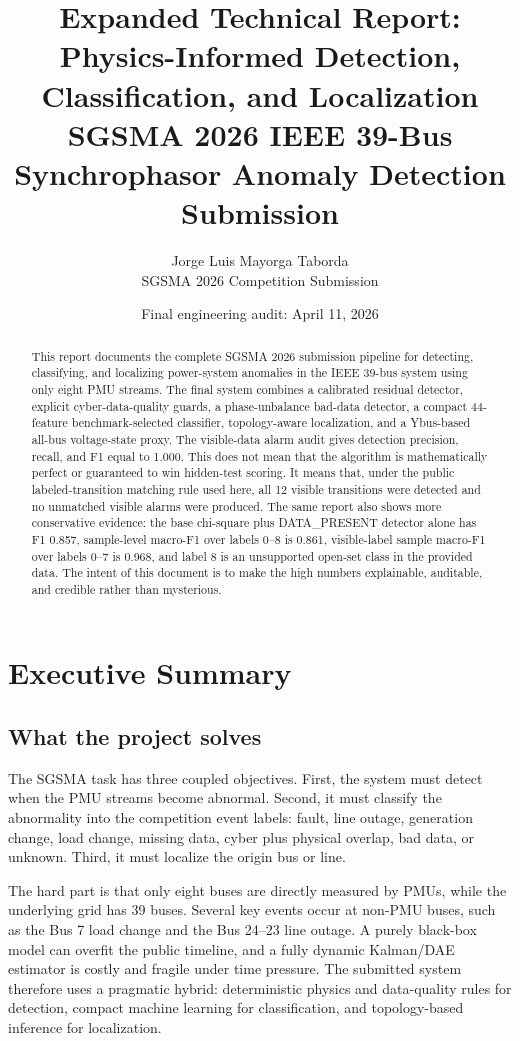 \documentclass[11pt]{article}
\title{\textbf{Expanded Technical Report: Physics-Informed Detection, Classification, and Localization}\\
\large SGSMA 2026 IEEE 39-Bus Synchrophasor Anomaly Detection Submission}
\author{Jorge Luis Mayorga Taborda\\
\small SGSMA 2026 Competition Submission}
\date{Final engineering audit: April 11, 2026}
\begin{document}
\maketitle

\begin{abstract}
This report documents the complete SGSMA 2026 submission pipeline for detecting,
classifying, and localizing power-system anomalies in the IEEE 39-bus system using
only eight PMU streams. The final system combines a calibrated residual detector,
explicit cyber-data-quality guards, a phase-unbalance bad-data detector, a compact
44-feature benchmark-selected classifier, topology-aware localization, and a Ybus-based
all-bus voltage-state proxy. The visible-data alarm audit gives detection
precision, recall, and F1 equal to 1.000. This does not mean that the algorithm
is mathematically perfect or guaranteed to win hidden-test scoring. It means
that, under the public labeled-transition matching rule used here, all 12 visible
transitions were detected and no unmatched visible alarms were produced. The same
report also shows more conservative evidence: the base chi-square plus
DATA\_PRESENT detector alone has F1 0.857, sample-level macro-F1 over labels 0--8
is 0.861, visible-label sample macro-F1 over labels 0--7 is 0.968, and label 8 is
an unsupported open-set class in the provided data. The intent of this document is
to make the high numbers explainable, auditable, and credible rather than
mysterious.
\end{abstract}

\tableofcontents
\newpage

\section{Executive Summary}

\subsection{What the project solves}

The SGSMA task has three coupled objectives. First, the system must detect when
the PMU streams become abnormal. Second, it must classify the abnormality into
the competition event labels: fault, line outage, generation change, load change,
missing data, cyber plus physical overlap, bad data, or unknown. Third, it must
localize the origin bus or line.

The hard part is that only eight buses are directly measured by PMUs, while the
underlying grid has 39 buses. Several key events occur at non-PMU buses, such as
the Bus 7 load change and the Bus 24--23 line outage. A purely black-box model can
overfit the public timeline, and a fully dynamic Kalman/DAE estimator is costly
and fragile under time pressure. The submitted system therefore uses a pragmatic
hybrid: deterministic physics and data-quality rules for detection, compact
machine learning for classification, and topology-based inference for
localization.
\end{document}
